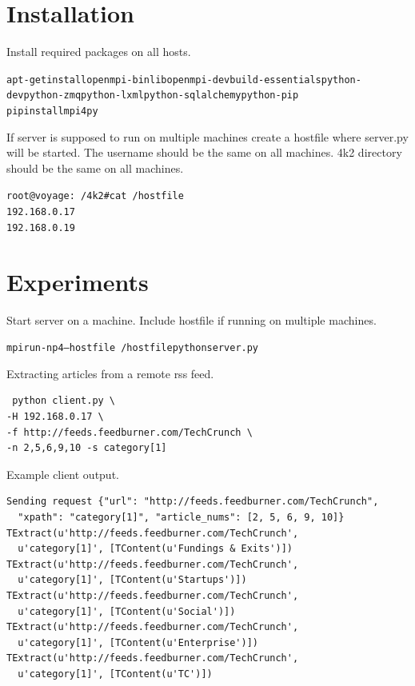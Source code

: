 \documentclass[a4paper,12pt]{article}
\begin{document}

\section{Installation}
Install required packages on all hosts.
\begin{alltt}
apt-get install openmpi-bin libopenmpi-dev build-essentials python-dev python-zmq python-lxml python-sqlalchemy python-pip
pip install mpi4py
\end{alltt}

If server is supposed to run on multiple machines create a hostfile where server.py will be started.
The username should be the same on all machines. 4k2 directory should be the same on all machines.
\begin{alltt}
root@voyage:~/4k2# cat ~/hostfile
192.168.0.17
192.168.0.19
\end{alltt}



\section{Experiments}
Start server on a machine. Include hostfile if running on multiple machines.
\begin{alltt}
mpirun -np 4 --hostfile ~/hostfile python server.py
\end{alltt}

Extracting articles from a remote rss feed.
\begin{verbatim}
 python client.py \
-H 192.168.0.17 \
-f http://feeds.feedburner.com/TechCrunch \
-n 2,5,6,9,10 -s category[1]
\end{verbatim}

Example client output. 
\begin{verbatim}
Sending request {"url": "http://feeds.feedburner.com/TechCrunch",
  "xpath": "category[1]", "article_nums": [2, 5, 6, 9, 10]}
TExtract(u'http://feeds.feedburner.com/TechCrunch', 
  u'category[1]', [TContent(u'Fundings & Exits')])
TExtract(u'http://feeds.feedburner.com/TechCrunch', 
  u'category[1]', [TContent(u'Startups')])
TExtract(u'http://feeds.feedburner.com/TechCrunch', 
  u'category[1]', [TContent(u'Social')])
TExtract(u'http://feeds.feedburner.com/TechCrunch', 
  u'category[1]', [TContent(u'Enterprise')])
TExtract(u'http://feeds.feedburner.com/TechCrunch', 
  u'category[1]', [TContent(u'TC')])
\end{verbatim}
\end{document}
